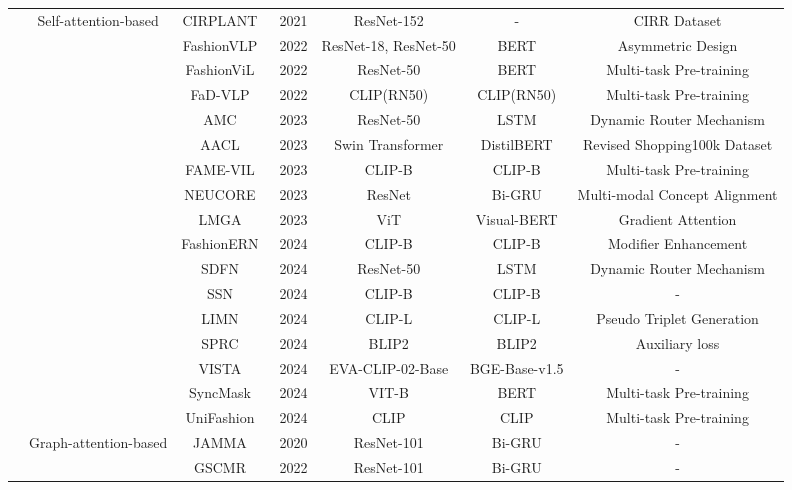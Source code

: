 \begin{table*}
{\begin{tabular}{|c|c|c|c|cc|c|}
& \multirow{17}{*}{Self-attention-based} & CIRPLANT~\cite{liu2021CIRPLANT} & 2021 & ResNet-152 & - & CIRR Dataset \\ \cline{3-7}
&  & FashionVLP~\cite{goenka2022fashionvlp} & 2022 & ResNet-18, ResNet-50 & BERT & Asymmetric Design \\ \cline{3-7}
&  & FashionViL~\cite{han2022fashionvil} & 2022 & ResNet-50 & BERT & Multi-task Pre-training \\ \cline{3-7}
&  & FaD-VLP~\cite{mirchandani2022fad} & 2022 & CLIP(RN50) & CLIP(RN50) & Multi-task Pre-training \\ \cline{3-7}
&  & AMC~\cite{zhu2023amc} & 2023 & ResNet-50 & LSTM & Dynamic Router Mechanism \\ \cline{3-7}
&  & AACL~\cite{tian2023aacl} & 2023 & Swin Transformer & DistilBERT & Revised Shopping100k Dataset \\ \cline{3-7}
&  & FAME-VIL~\cite{han2023fame} & 2023 & CLIP-B & CLIP-B & Multi-task Pre-training \\ \cline{3-7}
&  & NEUCORE~\cite{zhao2024neucore} & 2023 & ResNet & Bi-GRU & Multi-modal Concept Alignment \\ \cline{3-7}
&  & LMGA~\cite{udhayanan2023lmga} & 2023 & ViT & Visual-BERT & Gradient Attention \\ \cline{3-7}
&  & FashionERN~\cite{chen2024fashionern} & 2024 & CLIP-B & CLIP-B & Modifier Enhancement \\ \cline{3-7}
&  & SDFN~\cite{wu2024sdfn} & 2024 & ResNet-50 & LSTM & Dynamic Router Mechanism \\ \cline{3-7}
&  & SSN~\cite{yang2024ssn} & 2024 & CLIP-B & CLIP-B & - \\ \cline{3-7}
&  & LIMN~\cite{wen2023limn} & 2024 &CLIP-L & CLIP-L & Pseudo Triplet Generation \\ \cline{3-7}
&  & SPRC~\cite{xusentence2024sprc} & 2024 & BLIP2 & BLIP2 & Auxiliary loss \\ \cline{3-7}
&  & VISTA~\cite{zhou2024vista} & 2024 & EVA-CLIP-02-Base & BGE-Base-v1.5 & - \\ \cline{3-7}
&  & SyncMask~\cite{song2024syncmask} & 2024 & VIT-B & BERT & Multi-task Pre-training \\ \cline{3-7}
&  & UniFashion~\cite{zhao2024unifashion} & 2024 & CLIP & CLIP & Multi-task Pre-training \\ \cline{2-7}

& \multirow{2}{*}{Graph-attention-based} & JAMMA~\cite{zhang2020jamma} & 2020 & ResNet-101 & Bi-GRU & - \\ \cline{3-7}
&  & GSCMR~\cite{zhang2021GSCMR} & 2022 & ResNet-101 & Bi-GRU & - \\ \cline{3-7}


\end{tabular}}
\end{table*}
